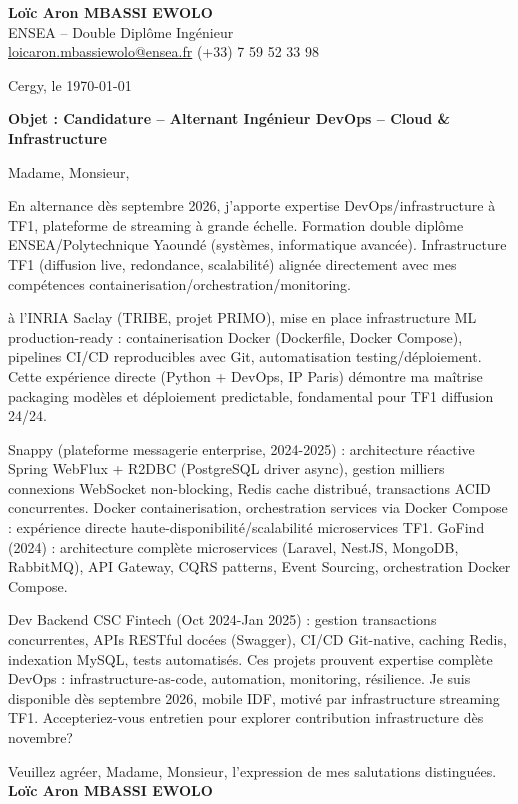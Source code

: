 \documentclass[a4paper,11pt]{article}
\begin{document}
\noindent \textbf{Lo\"ic Aron MBASSI EWOLO} \\
ENSEA -- Double Dipl\^ome Ing\'enieur \\
\href{mailto:loicaron.mbassiewolo@ensea.fr}{loicaron.mbassiewolo@ensea.fr} \quad (+33) 7 59 52 33 98

\vspace{1em}
\noindent Cergy, le \today

\vspace{1em}
\noindent \textbf{Objet : Candidature -- Alternant Ing\'enieur DevOps -- Cloud \& Infrastructure}

\vspace{1.5em}
\noindent Madame, Monsieur,

\vspace{0.8em}
\noindent En alternance d\`es septembre 2026, j'apporte expertise DevOps/infrastructure \`a TF1, plateforme de streaming \`a grande \'echelle. Formation double dipl\^ome ENSEA/Polytechnique Yaound\'e (syst\`emes, informatique avanc\'ee). Infrastructure TF1 (diffusion live, redondance, scalabilit\'e) alignée directement avec mes comp\'etences containerisation/orchestration/monitoring.

\vspace{0.8em}
\noindent \`a l'INRIA Saclay (TRIBE, projet PRIMO), mise en place infrastructure ML production-ready : containerisation Docker (Dockerfile, Docker Compose), pipelines CI/CD reproducibles avec Git, automatisation testing/d\'eploiement. Cette exp\'erience directe (Python + DevOps, IP Paris) d\'emontre ma ma\^itrise packaging mod\`eles et d\'eploiement predictable, fondamental pour TF1 diffusion 24/24.

\vspace{0.8em}
\noindent Snappy (plateforme messagerie enterprise, 2024-2025) : architecture r\'eactive Spring WebFlux + R2DBC (PostgreSQL driver async), gestion milliers connexions WebSocket non-blocking, Redis cache distribu\'e, transactions ACID concurrentes. Docker containerisation, orchestration services via Docker Compose : exp\'erience directe haute-disponibilit\'e/scalabilit\'e microservices TF1. GoFind (2024) : architecture complète microservices (Laravel, NestJS, MongoDB, RabbitMQ), API Gateway, CQRS patterns, Event Sourcing, orchestration Docker Compose.

\vspace{0.8em}
\noindent Dev Backend CSC Fintech (Oct 2024-Jan 2025) : gestion transactions concurrentes, APIs RESTful doc\'ees (Swagger), CI/CD Git-native, caching Redis, indexation MySQL, tests automatis\'es. Ces projets prouvent expertise complète DevOps : infrastructure-as-code, automation, monitoring, r\'esilience. Je suis disponible d\`es septembre 2026, mobile IDF, motiv\'e par infrastructure streaming TF1. Accepteriez-vous entretien pour explorer contribution infrastructure d\`es novembre?

\vspace{1.5em}
\noindent Veuillez agr\'eer, Madame, Monsieur, l'expression de mes salutations distingu\'ees.
\vspace{2em}
\noindent \textbf{Lo\"ic Aron MBASSI EWOLO}
\end{document}
